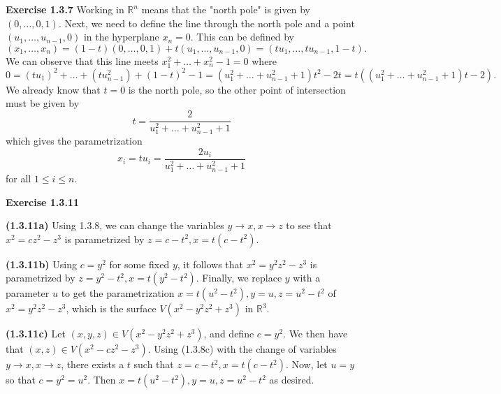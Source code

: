 \documentclass[12pt,oneside]{article}
\newenvironment{exercise}[1]{\vspace{.1in}\noindent\textbf{Exercise #1 \hspace{.05em}}}{}
\newcommand{\R}{\mathbb{R}}
\begin{document}

\begin{exercise}{1.3.7}
    Working in $\R^n$ means that the "north pole" is given by $(0,\ldots,0,1)$. Next, we 
    need to define the line through the north pole and a point $(u_1, \ldots, u_{n-1}, 0)$
    in the hyperplane $x_n = 0$. This can be defined by 
    \[
        (x_1, \ldots, x_n) = (1-t)(0, \ldots, 0, 1) + t(u_1, \ldots, u_{n-1}, 0) = (tu_1, \ldots, tu_{n-1}, 1 - t).
    \]
    We can observe that this line meets $x_1^2 + \ldots + x_n^2 - 1 = 0$ where 
    \[
        0 = (tu_1)^2 + \ldots + (tu_{n-1}^2) + (1 - t)^2 - 1 = (u_1^2 + \ldots + u_{n-1}^2 + 1)t^2 - 2t = t((u_1^2 + \ldots + u_{n-1}^2 + 1)t - 2).
    \]
    We already know that $t = 0$ is the north pole, so the other point of intersection 
    must be given by 
    \[
        t = \frac{2}{u_1^2 + \ldots + u_{n - 1}^2 + 1}
    \]
    which gives the parametrization
    \[
        x_i = tu_i = \frac{2u_i}{u_1^2 + \ldots + u_{n - 1}^2 + 1}
    \]
    for all $1 \leq i \leq n$.
\end{exercise}


\begin{exercise}{1.3.11}

    \bigskip
    \textbf{(1.3.11a)}
    Using 1.3.8, we can change the variables $y \rightarrow x, x \rightarrow z$ to 
    see that $x^2 = cz^2 - z^3$ is parametrized by $z = c - t^2, x = t(c - t^2)$.
    
    \bigskip
    \textbf{(1.3.11b)}
    Using $c = y^2$ for some fixed $y$, it follows that $x^2 = y^2z^2 - z^3$ is 
    parametrized by $z = y^2 - t^2, x = t(y^2 - t^2)$. Finally, we replace $y$ 
    with a parameter $u$ to get the parametrization $x = t(u^2 - t^2), y = u, z = u^2 - t^2$
    of $x^2 = y^2z^2 - z^3$, which is the surface $V(x^2 - y^2z^2 + z^3)$ in $\R^3$.
    
    \bigskip
    \textbf{(1.3.11c)}
    Let $(x,y,z) \in V(x^2 - y^2z^2 + z^3)$, and define $c = y^2$. We then have that 
    $(x,z) \in V(x^2 - cz^2 - z^3)$. Using (1.3.8c) with the change of variables 
    $y \rightarrow x, x \rightarrow z$, there exists a $t$ such that 
    $z = c - t^2, x = t(c - t^2)$. Now, let $u = y$ so that $c = y^2 = u^2$. Then 
    $x = t(u^2-t^2), y = u, z = u^2 - t^2$ as desired.
\end{exercise}

\end{document}

